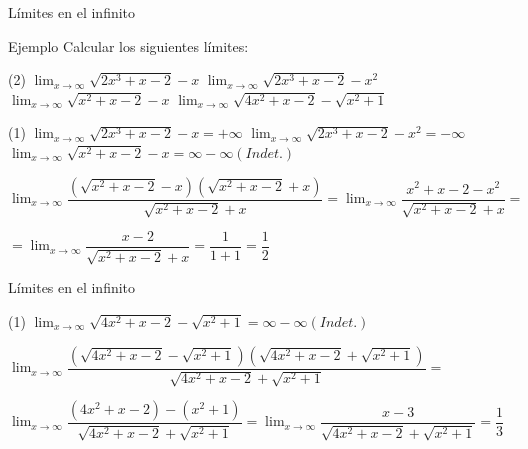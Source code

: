 \documentclass[8pt,handout]{beamer}
\newcommand{\limite}[2]{\displaystyle \lim_{x \rightarrow #1}{#2}}
\begin{document}
\begin{frame}{Límites en el infinito}
\begin{exampleblock}{Ejemplo}
Calcular los siguientes límites:
\begin{tasks}[label=\alph*)](2)
\task $\limite{\infty}{\sqrt{2x^3+x-2}-x}$
\task $\limite{\infty}{\sqrt{2x^3+x-2}-x^2}$
\task $\limite{\infty}{\sqrt{x^2+x-2}-x}$
\task $\limite{\infty}{\sqrt{4x^2+x-2}-\sqrt{x^2+1}}$
\end{tasks}
\end{exampleblock}

\begin{tasks}[label=\alph*)](1)
\task $\limite{\infty}{\sqrt{2x^3+x-2}-x} = +\infty$
\task $\limite{\infty}{\sqrt{2x^3+x-2}-x^2}= - \infty$
\task $\limite{\infty}{\sqrt{x^2+x-2}-x}= \infty - \infty (Indet.)$

\vspace{10pt}
$\limite{\infty}{\dfrac{(\sqrt{x^2+x-2}-x)(\sqrt{x^2+x-2}+x)}{\sqrt{x^2+x-2}+x}}= 
\limite{\infty}{\dfrac{x^2+x-2-x^2}{\sqrt{x^2+x-2}+x}}= $

\vspace{10pt}
$=\limite{\infty}{\dfrac{x-2}{\sqrt{x^2+x-2}+x}}=\dfrac{1}{1+1}=\dfrac{1}{2}$

\end{tasks}

\end{frame}

\begin{frame}{Límites en el infinito}
\begin{tasks}[label=\alph*),resume](1)
\task $\limite{\infty}{\sqrt{4x^2+x-2}-\sqrt{x^2+1}}=\infty - \infty (Indet.)$

\vspace{10pt}
 $\limite{\infty}{\dfrac{(\sqrt{4x^2+x-2}-\sqrt{x^2+1})(\sqrt{4x^2+x-2}+\sqrt{x^2+1})}{\sqrt{4x^2+x-2}+\sqrt{x^2+1}}}=$
 
 \vspace{10pt}
$\limite{\infty}{\dfrac{(4x^2+x-2)-(x^2+1)}{\sqrt{4x^2+x-2}+\sqrt{x^2+1}}}= \limite{\infty}{\dfrac{x-3}{\sqrt{4x^2+x-2}+\sqrt{x^2+1}}}= \dfrac{1}{3}$
\end{tasks}
\end{frame}
\end{document}
